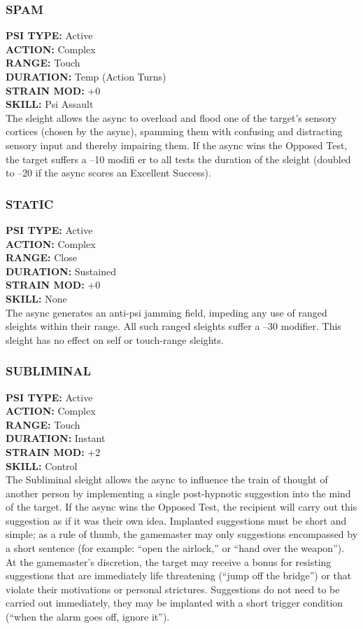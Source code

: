 \subsubsection{SPAM} \textbf{PSI TYPE:} Active \\ \textbf{ACTION:} Complex \\ \textbf{RANGE:} Touch \\ \textbf{DURATION:} Temp (Action Turns) \\ \textbf{STRAIN MOD:} +0 \\ \textbf{SKILL:} Psi Assault \\ The sleight allows the async to overload and flood one of the target’s sensory cortices (chosen by the async), spamming them with confusing and distracting sensory input and thereby impairing them. If the async wins the Opposed Test, the target suffers a –10 modifi er to all tests the duration of the sleight (doubled to –20 if the async scores an Excellent Success). 

\subsubsection{STATIC} \textbf{PSI TYPE:} Active \\ \textbf{ACTION:} Complex \\ \textbf{RANGE:} Close \\ \textbf{DURATION:} Sustained \\ \textbf{STRAIN MOD:} +0 \\ \textbf{SKILL:} None\\ The async generates an anti-psi jamming field, impeding any use of ranged sleights within their range. All such ranged sleights suffer a –30 modifier. This sleight has no effect on self or touch-range sleights. 

\subsubsection{SUBLIMINAL} \textbf{PSI TYPE:} Active \\ \textbf{ACTION:} Complex \\ \textbf{RANGE:} Touch \\ \textbf{DURATION:} Instant \\ \textbf{STRAIN MOD:} +2 \\ \textbf{SKILL:} Control\\ The Subliminal sleight allows the async to influence the train of thought of another person by implementing a single post-hypnotic suggestion into the mind of the target. If the async wins the Opposed Test, the recipient will carry out this suggestion as if it was their own idea. Implanted suggestions must be short and simple; as a rule of thumb, the gamemaster may only suggestions encompassed by a short sentence (for example: “open the airlock,” or “hand over the weapon”). At the gamemaster’s discretion, the target may receive a bonus for resisting suggestions that are immediately life threatening (“jump off the bridge”) or that violate their motivations or personal strictures. Suggestions do not need to be carried out immediately, they may be implanted with a short trigger condition (“when the alarm goes off, ignore it”). 

